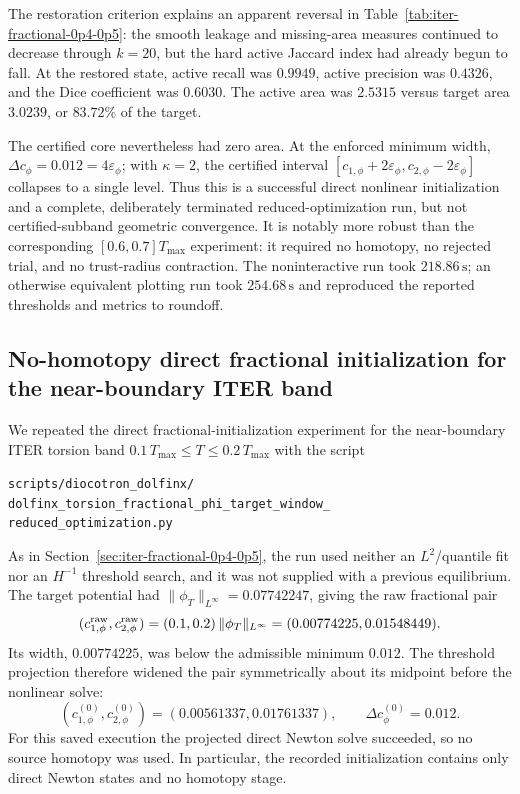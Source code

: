 The restoration criterion explains an apparent reversal in
Table~\ref{tab:iter-fractional-0p4-0p5}: the smooth leakage and missing-area
measures continued to decrease through $k=20$, but the hard active Jaccard
index had already begun to fall. At the restored state, active recall was
$0.9949$, active precision was $0.4326$, and the Dice coefficient was
$0.6030$. The active area was $2.5315$ versus target area $3.0239$, or
$83.72\%$ of the target.

The certified core nevertheless had zero area. At the enforced minimum width,
$\Delta c_\phi=0.012=4\varepsilon_\phi$; with $\kappa=2$, the certified
interval
$[c_{1,\phi}+2\varepsilon_\phi,c_{2,\phi}-2\varepsilon_\phi]$ collapses to a
single level. Thus this is a successful direct nonlinear initialization and
a complete, deliberately terminated reduced-optimization run, but not
certified-subband geometric convergence. It is notably more robust than the
corresponding $[0.6,0.7]T_{\max}$ experiment: it required no homotopy, no
rejected trial, and no trust-radius contraction. The noninteractive run took
$218.86\,\mathrm{s}$; an otherwise equivalent plotting run took
$254.68\,\mathrm{s}$ and reproduced the reported thresholds and metrics to
roundoff.
\clearpage
\subsection{No-homotopy direct fractional initialization for the near-boundary ITER band}
\label{sec:iter-fractional-0p1-0p2}
We repeated the direct fractional-initialization experiment for the
near-boundary ITER torsion band
$0.1\,T_{\max}\leq T\leq0.2\,T_{\max}$ with the script
\begin{center}
  \small
  \texttt{scripts/diocotron\_dolfinx/}\\[-0.2ex]
  \texttt{dolfinx\_torsion\_fractional\_phi\_target\_window\_}\\[-0.2ex]
  \texttt{reduced\_optimization.py}
\end{center}
As in Section~\ref{sec:iter-fractional-0p4-0p5}, the run used neither an
$L^2$/quantile fit nor an $H^{-1}$ threshold search, and it was not supplied
with a previous equilibrium. The target potential had
$\|\phi_T\|_{L^\infty}=0.07742247$, giving the raw fractional pair
\[
  (c_{1,\phi}^{\rm raw},c_{2,\phi}^{\rm raw})
  =(0.1,0.2)\,\|\phi_T\|_{L^\infty}
  =(0.00774225,0.01548449).
\]
Its width, $0.00774225$, was below the admissible minimum $0.012$. The
threshold projection therefore widened the pair symmetrically about its
midpoint before the nonlinear solve:
\[
  (c_{1,\phi}^{(0)},c_{2,\phi}^{(0)})
  =(0.00561337,0.01761337),
  \qquad \Delta c_\phi^{(0)}=0.012.
\]
For this saved execution the projected direct Newton solve succeeded, so no
source homotopy was used. In particular, the recorded initialization contains
only direct Newton states and no homotopy stage.

